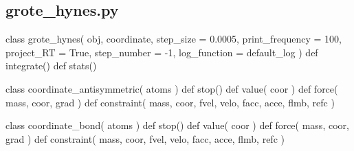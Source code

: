 \normalsize
\subsection[grote\_hynes]{grote\_hynes.py}

\begin{pyglist}[language=python,fvset={frame=single}]
class grote_hynes( obj, coordinate, step_size = 0.0005, print_frequency = 100,
         project_RT = True, step_number = -1, log_function = default_log )
	def integrate()
	def stats()

class coordinate_antisymmetric( atoms )
	def stop()
	def value( coor )
	def force( mass, coor, grad )
	def constraint( mass, coor, fvel, velo, facc, acce, flmb, refc )

class coordinate_bond( atoms )
	def stop()
	def value( coor )
	def force( mass, coor, grad )
	def constraint( mass, coor, fvel, velo, facc, acce, flmb, refc )
\end{pyglist}

\footnotesize
\begin{pyglist}[language=python,fvset={frame=single}]
\end{pyglist}
